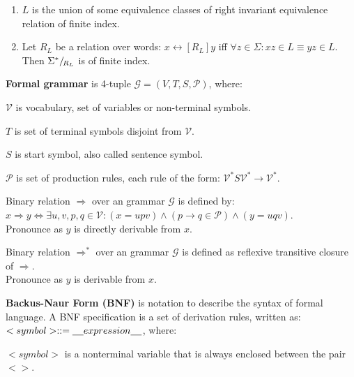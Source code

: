\documentclass[a4paper,10pt]{article}
\begin{document}
\begin{terms}
\begin{enumerate}
        \item $L$ is the union of some equivalence classes of right invariant equivalence relation of finite index.

        \item Let $R_L$ be a relation over words: $x \rel[R_L] y$ iff $\forall z \in \Sigma : xz \in L \equiv yz \in L$.
        Then $\quotient[R_L]{\Sigma^*}$ is of finite index.
    \end{enumerate}

    \newpage
    \item \textbf{Formal grammar} is 4-tuple $\mathcal{G} = (V, T, S, \mathcal{P})$, where:

    \begin{terms} 
        \item $\mathcal{V}$ is vocabulary, set of variables or non-terminal symbols.

        \item $T$ is set of terminal symbols disjoint from $\mathcal{V}$.

        \item $S$ is start symbol, also called sentence symbol.

        \item $\mathcal{P}$ is set of production rules, each rule of the form:
        $\mathcal{V}^*S\mathcal{V}^* \xrightarrow{} \mathcal{V}^*$.
    \end{terms}

    \item Binary relation $\mathbf{\Rightarrow}$ over an grammar $\mathcal{G}$ is defined by:\\
    $x \Rightarrow y \Longleftrightarrow \exists u,v,p,q \in \mathcal{V}: (x = upv) \land (p \rightarrow{} q \in \mathcal{P}) \land (y = uqv)$.\\
    Pronounce as $y$ is directly derivable from $x$.
    \item Binary relation $\mathbf{\Rightarrow^*}$ over an grammar $\mathcal{G}$ is defined as reflexive transitive closure of $\Rightarrow$.\\
    Pronounce as $y$ is derivable from $x$.

    \item \textbf{Backus-Naur Form (BNF)} is notation to describe the syntax of formal language. A BNF specification is a set of derivation rules, written as:\\
    $<symbol> ::= \underline{\hspace{4mm}}{}expression\underline{\hspace{4mm}}$, where:
    \begin{terms}
        \item $<symbol>$ is a nonterminal variable that is always enclosed between the pair $<>$.


\end{terms}
\end{terms}
\end{document}
